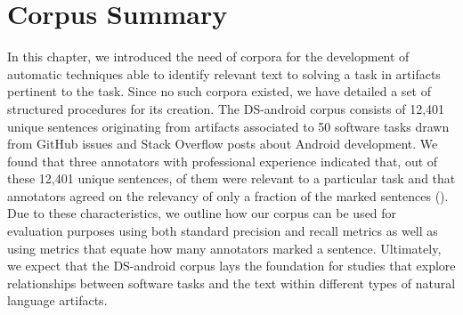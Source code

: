 
\section{Corpus Summary}
\label{cp4:corpus-summary}

In this chapter, we introduced the need of corpora 
for the development of 
automatic techniques able to identify relevant text
to solving a task in artifacts
pertinent to the task.
Since  no such corpora
existed, we have detailed 
a set of structured procedures for its creation. 
The \acs{DS-android} corpus consists of  
12,401 unique sentences
originating from artifacts associated to 50 software tasks
drawn from GitHub issues and Stack Overflow posts about Android development. 
We found that 
three annotators with professional experience indicated that,
out of these 12,401 unique sentences, 
 of them were relevant to a particular task and that 
annotators agreed on the relevancy of  
only a fraction of the marked sentences ().
Due to these characteristics, 
we outline how our corpus can be used for evaluation purposes 
using both standard precision and recall metrics as well as using
metrics that equate how many annotators marked a sentence. 
Ultimately, we expect that the \acs{DS-android} corpus
lays the foundation for studies that explore relationships between software tasks
and the text within different types of natural language artifacts.













